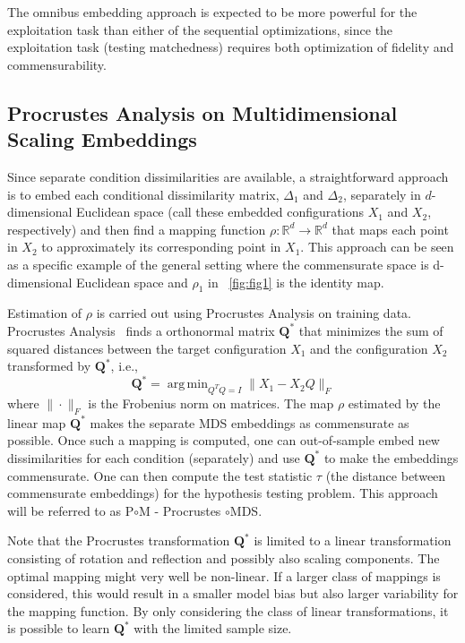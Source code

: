 \documentclass[11pt]{article} %
\DeclareMathOperator*{\argmin}{arg\,min}
\begin{document}
 The omnibus embedding  approach is expected to be more powerful for the exploitation task than either of  the sequential optimizations, since the exploitation task (testing matchedness) requires both optimization of fidelity and commensurability.

\subsection{Procrustes Analysis on Multidimensional Scaling Embeddings\label{subsec:PoM}} 
Since separate  condition dissimilarities are available, a straightforward approach is to embed each conditional dissimilarity matrix, $\Delta_1$ and $\Delta_2$, separately  in  $d$-dimensional Euclidean space (call these embedded configurations $X_1$ and $X_2$, respectively) and then find a mapping function $\rho :\mathbb{R}^{d}\rightarrow\mathbb{R}^{d}$ that maps each point in $X_2$ to approximately its corresponding point in $X_1$. This approach can be seen as a specific example of the general setting where the commensurate space is d-dimensional  Euclidean space and $\rho_1$ in  ~\ref{fig:fig1} is the identity map. 

Estimation of $\rho$ is carried out using  Procrustes Analysis  on training data. Procrustes Analysis~\cite{Sibson} finds a orthonormal matrix $\mathbf{Q}^*$ that minimizes the sum of squared distances between the  target configuration $X_1$ and  the configuration $X_2$ transformed by $\mathbf{Q}^*$, i.e.,
 \[\mathbf{Q}^* = \argmin_{Q^TQ = I} \|X_1 - X_2Q\|_F\] 
 where $\|\cdot\|_F$ is the Frobenius norm on matrices. The map $\rho$ estimated by the linear map $\mathbf{Q}^*$   makes the separate MDS embeddings as commensurate as possible. Once such a mapping is computed, one can out-of-sample embed  new dissimilarities for each condition (separately)  and  use $\mathbf{Q}^*$ to make the embeddings commensurate.
One can then compute the test statistic $\tau$ (the distance between commensurate embeddings) for  the hypothesis testing problem. This approach will be referred to  as P$\circ$M - Procrustes $\circ$MDS.

Note that the Procrustes transformation $\mathbf{Q}^*$  is limited to  a linear transformation consisting of rotation and reflection and possibly also scaling components. The optimal mapping might  very well be   non-linear. If a larger class of mappings is considered, this would result in a smaller model bias but also larger variability for the mapping function. By only considering the class of linear transformations, it is possible to learn $\mathbf{Q}^{*}$ with the limited sample size.
\end{document}

